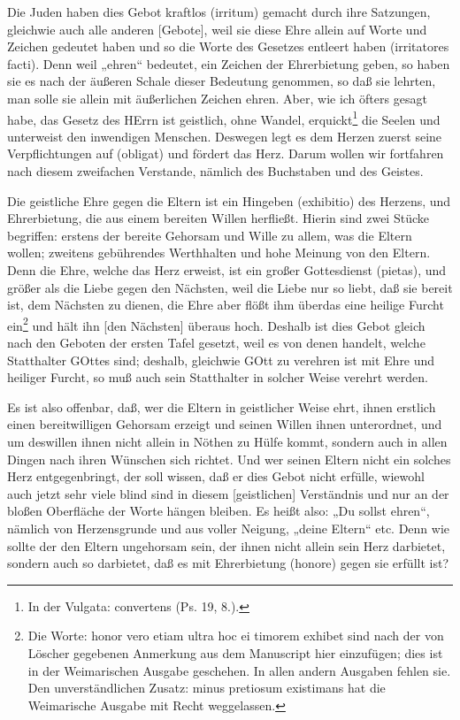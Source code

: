 Die Juden haben dies Gebot kraftlos (irritum) gemacht durch ihre Satzungen, gleichwie auch alle anderen [Gebote], weil sie diese Ehre allein auf Worte und Zeichen gedeutet haben und so die Worte des Gesetzes entleert haben (irritatores facti). Denn weil „ehren“ bedeutet, ein Zeichen der Ehrerbietung geben, so haben sie es nach der äußeren Schale dieser Bedeutung genommen, so daß sie lehrten, man solle sie allein mit äußerlichen Zeichen ehren. Aber, wie ich öfters gesagt habe, das Gesetz des HErrn ist geistlich, ohne Wandel, erquickt\footnote{In der Vulgata: convertens (Ps. 19, 8.).} die Seelen und unterweist den inwendigen Menschen. Deswegen legt es dem Herzen zuerst seine Verpflichtungen auf (obligat) und fördert das Herz. Darum wollen wir fortfahren nach diesem zweifachen Verstande, nämlich des Buchstaben und des Geistes.

Die geistliche Ehre gegen die Eltern ist ein Hingeben (exhibitio) des Herzens, und Ehrerbietung, die aus einem bereiten Willen herfließt. Hierin sind zwei Stücke begriffen: erstens der bereite Gehorsam und Wille zu allem, was die Eltern wollen; zweitens gebührendes Werthhalten und hohe Meinung von den Eltern. Denn die Ehre, welche das Herz erweist, ist ein großer Gottesdienst (pietas), und größer als die Liebe gegen den Nächsten, weil die Liebe nur so liebt, daß sie bereit ist, dem Nächsten zu dienen, die Ehre aber flößt ihm überdas eine heilige Furcht ein\footnote{Die Worte: honor vero etiam ultra hoc ei timorem exhibet sind nach der von Löscher gegebenen Anmerkung aus dem Manuscript hier einzufügen; dies ist in der Weimarischen Ausgabe geschehen. In allen andern Ausgaben fehlen sie. Den unverständlichen Zusatz: minus pretiosum existimans hat die Weimarische Ausgabe mit Recht weggelassen.} und hält ihn [den Nächsten] überaus hoch. Deshalb ist dies Gebot gleich nach den Geboten der ersten Tafel gesetzt, weil es von denen handelt, welche Statthalter GOttes sind; deshalb, gleichwie GOtt zu verehren ist mit Ehre und heiliger Furcht, so muß auch sein Statthalter in solcher Weise verehrt werden.

Es ist also offenbar, daß, wer die Eltern in geistlicher Weise ehrt, ihnen erstlich einen bereitwilligen Gehorsam erzeigt und seinen Willen ihnen unterordnet, und um deswillen ihnen nicht allein in Nöthen zu Hülfe kommt, sondern auch in allen Dingen nach ihren Wünschen sich richtet. Und wer seinen Eltern nicht ein solches Herz entgegenbringt, der soll wissen, daß er dies Gebot nicht erfülle, wiewohl auch jetzt sehr viele blind sind in diesem [geistlichen] Verständnis und nur an der bloßen Oberfläche der Worte hängen bleiben. Es heißt also: „Du sollst ehren“, nämlich von Herzensgrunde und aus voller Neigung, „deine Eltern“ etc. Denn wie sollte der den Eltern ungehorsam sein, der ihnen nicht allein sein Herz darbietet, sondern auch so darbietet, daß es mit Ehrerbietung (honore) gegen sie erfüllt ist?

